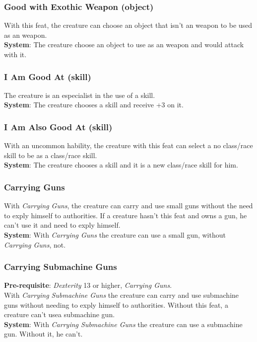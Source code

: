 \documentclass[ letterpaper,12pt]{article}
\begin{document}
\subsubsection{Good with Exothic Weapon (object)}
With this feat, the creature can choose an object that isn't an weapon to be used as an weapon.\\
{\bf System}: The creature choose an object to use as an weapon and would attack with it.

\subsubsection{I Am Good At (skill)}
The creature is an especialist in the use of a skill.\\
{\bf System}: The creature chooses a skill and receive +3 on it.

\subsubsection{I Am Also Good At (skill)}
With an uncommon hability, the creature with this feat can select a no class/race skill to be as a class/race skill.\\
{\bf System}: The creature chooses a skill and it is a new class/race skill for him.

\subsubsection{Carrying Guns}
With {\it Carrying Guns}, the creature can carry and use small guns without the need to exply himself to authorities. If a creature hasn't this feat and owns a gun, he can't use it and need to exply himself.\\
{\bf System}: With {\it Carrying Guns} the creature can use a small gun, without {\it Carrying Guns}, not.

\subsubsection{Carrying Submachine Guns}
{\bf Pre-requisite}: {\it Dexterity} 13 or higher, {\it Carrying Guns}.\\
With {\it Carrying Submachine Guns} the creature can carry and use submachine guns without needing to exply himself to authorities. Without this feat, a creature can't usea submachine gun.\\
{\bf System}: With {\it Carrying Submachine Guns} the creature can use a submachine gun. Without it, he can't.
\end{document}
